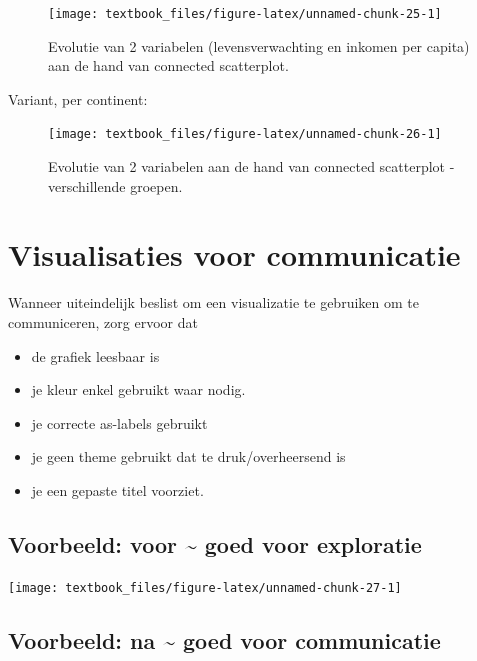 \documentclass[]{tufte-book}
\providecommand{\tightlist}{%
  \setlength{\itemsep}{0pt}\setlength{\parskip}{0pt}}
\begin{document}
\begin{figure}
\texttt{[image: textbook\_files/figure-latex/unnamed-chunk-25-1]} \caption[Evolutie van 2 variabelen (levensverwachting en inkomen per capita) aan de hand van connected scatterplot]{Evolutie van 2 variabelen (levensverwachting en inkomen per capita) aan de hand van connected scatterplot.}\label{fig:unnamed-chunk-25}
\end{figure}

Variant, per continent:

\begin{figure}
\texttt{[image: textbook\_files/figure-latex/unnamed-chunk-26-1]} \caption[Evolutie van 2 variabelen aan de hand van connected scatterplot - verschillende groepen]{Evolutie van 2 variabelen aan de hand van connected scatterplot - verschillende groepen.}\label{fig:unnamed-chunk-26}
\end{figure}

\hypertarget{visualisaties-voor-communicatie}{%
\section{Visualisaties voor communicatie}\label{visualisaties-voor-communicatie}}

Wanneer uiteindelijk beslist om een visualizatie te gebruiken om te communiceren, zorg ervoor dat

\begin{itemize}
\tightlist
\item
  de grafiek leesbaar is
\item
  je kleur enkel gebruikt waar nodig.
\item
  je correcte as-labels gebruikt
\item
  je geen theme gebruikt dat te druk/overheersend is
\item
  je een gepaste titel voorziet.
\end{itemize}

\hypertarget{voorbeeld-voor-goed-voor-exploratie}{%
\subsection{Voorbeeld: voor \textasciitilde{} goed voor exploratie}\label{voorbeeld-voor-goed-voor-exploratie}}

\texttt{[image: textbook\_files/figure-latex/unnamed-chunk-27-1]}

\hypertarget{voorbeeld-na-goed-voor-communicatie}{%
\subsection{Voorbeeld: na \textasciitilde{} goed voor communicatie}\label{voorbeeld-na-goed-voor-communicatie}}
\end{document}
